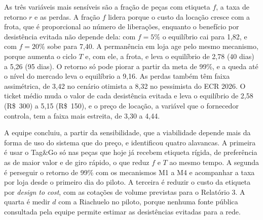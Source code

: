 As três variáveis mais sensíveis são a fração de peças com etiqueta $f$, a taxa de retorno $r$ e as perdas. A fração $f$ lidera porque o custo da locação cresce com a frota, que é proporcional ao número de liberações, enquanto o benefício por desistência evitada não depende dela: com $f = 5\%$ o equilíbrio cai para 1,82, e com $f = 20\%$ sobe para 7,40. A permanência em loja age pelo mesmo mecanismo, porque aumenta o ciclo $T$ e, com ele, a frota, e leva o equilíbrio de 2,78 (40 dias) a 5,26 (95 dias). O retorno só pode piorar a partir da meta de 99\%, e a queda até o nível do mercado leva o equilíbrio a 9,16. As perdas também têm faixa assimétrica, de 3,42 no cenário otimista a 8,32 no pessimista do ECR 2026. O ticket médio muda o valor de cada desistência evitada e leva o equilíbrio de 2,58 (R\$~300) a 5,15 (R\$~150), e o preço de locação, a variável que o fornecedor controla, tem a faixa mais estreita, de 3,30 a 4,44.

A equipe concluiu, a partir da sensibilidade, que a viabilidade depende mais da forma de uso do sistema que do preço, e identificou quatro alavancas. A primeira é usar o Tag\&Go só nas peças que hoje já recebem etiqueta rígida, de preferência as de maior valor e de giro rápido, o que reduz $f$ e $T$ ao mesmo tempo. A segunda é perseguir o retorno de 99\% com os mecanismos M1 a M4 e acompanhar a taxa por loja desde o primeiro dia do piloto. A terceira é reduzir o custo da etiqueta por \textit{design to cost}, com as cotações de volume previstas para o Relatório 3. A quarta é medir $d$ com a Riachuelo no piloto, porque nenhuma fonte pública consultada pela equipe permite estimar as desistências evitadas para a rede.

